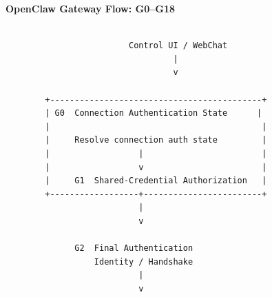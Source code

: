 \clearpage
\begin{landscape}

\begin{figure}[p]
\centering

{\Large\bfseries OpenClaw Gateway Flow: G0--G18}

\vspace{4mm}

\footnotesize

\begin{verbatim}

                         Control UI / WebChat
                                  |
                                  v

        +-------------------------------------------+
        | G0  Connection Authentication State      |
        |                                           |
        |     Resolve connection auth state         |
        |                  |                        |
        |                  v                        |
        |     G1  Shared-Credential Authorization   |
        +------------------+------------------------+
                           |
                           v

              G2  Final Authentication
                  Identity / Handshake
                           |
                           v


\end{verbatim}
\end{figure}
\end{landscape}
